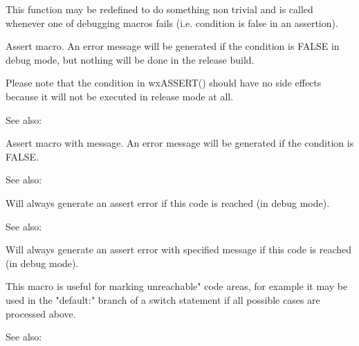 \label{wxonassert}


This function may be redefined to do something non trivial and is called
whenever one of debugging macros fails (i.e. condition is false in an
assertion).

\label{wxassert}


Assert macro. An error message will be generated if the condition is FALSE in
debug mode, but nothing will be done in the release build.

Please note that the condition in wxASSERT() should have no side effects
because it will not be executed in release mode at all.

See also: 

\label{wxassertmsg}


Assert macro with message. An error message will be generated if the condition is FALSE.

See also: 

\label{wxfail}


Will always generate an assert error if this code is reached (in debug mode).

See also: 

\label{wxfailmsg}


Will always generate an assert error with specified message if this code is reached (in debug mode).

This macro is useful for marking unreachable" code areas, for example
it may be used in the "default:" branch of a switch statement if all possible
cases are processed above.

See also: 

\label{wxcheck}


